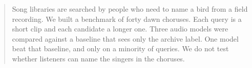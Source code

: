 \begin{abstract}
Song libraries are searched by people who need to name a bird from a field recording. We built a benchmark of forty dawn choruses. Each query is a short clip and each candidate a longer one. Three audio models were compared against a baseline that sees only the archive label. One model beat that baseline, and only on a minority of queries. We do not test whether listeners can name the singers in the choruses.
\end{abstract}
